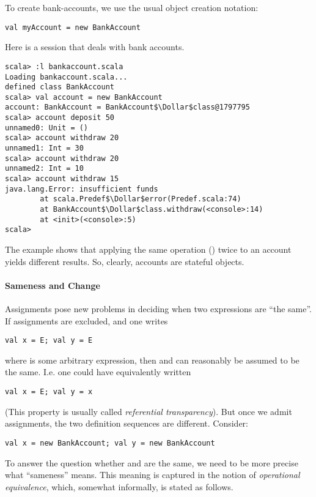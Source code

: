 {To create bank-accounts, we use the usual object creation notation:
\begin{lstlisting}
val myAccount = new BankAccount
\end{lstlisting}

\example Here is a  session that deals with bank
accounts.

\begin{lstlisting}
scala> :l bankaccount.scala
Loading bankaccount.scala...
defined class BankAccount
scala> val account = new BankAccount
account: BankAccount = BankAccount$\Dollar$class@1797795
scala> account deposit 50
unnamed0: Unit = ()
scala> account withdraw 20
unnamed1: Int = 30
scala> account withdraw 20
unnamed2: Int = 10
scala> account withdraw 15
java.lang.Error: insufficient funds
        at scala.Predef$\Dollar$error(Predef.scala:74)
        at BankAccount$\Dollar$class.withdraw(<console>:14)
        at <init>(<console>:5)
scala> 
\end{lstlisting}
The example shows that applying the same operation () twice to an account yields different results. So, clearly,
accounts are stateful objects.  

\paragraph{Sameness and Change}
Assignments pose new problems in deciding when two expressions are
``the same''.
If assignments are excluded, and one writes
\begin{lstlisting}
val x = E; val y = E
\end{lstlisting}
where  is some arbitrary expression,
then  and  can reasonably be assumed to be the same.
I.e. one could have equivalently written
\begin{lstlisting}
val x = E; val y = x
\end{lstlisting}
(This property is usually called {\em referential transparency}). But
once we admit assignments, the two definition sequences are different.
Consider:
\begin{lstlisting}
val x = new BankAccount; val y = new BankAccount
\end{lstlisting}
To answer the question whether  and  are the same, we
need to be more precise what ``sameness'' means. This meaning is
captured in the notion of {\em operational equivalence}, which,
somewhat informally, is stated as follows.

}
